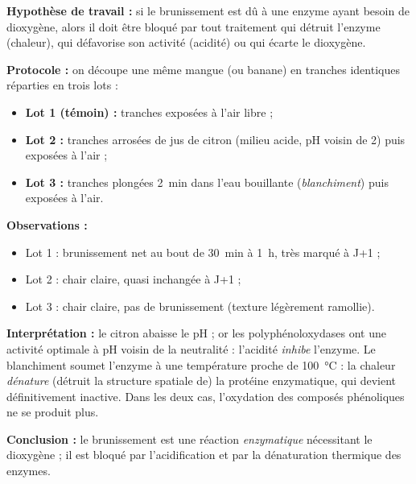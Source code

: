 \documentclass[11pt]{article}
\newcommand{\cle}[1]{{\popxbold\color{popdark}#1}}
\begin{document}
\textbf{Hypothèse de travail :} si le brunissement est dû à une enzyme ayant besoin de dioxygène, alors il doit être bloqué par tout traitement qui détruit l'enzyme (chaleur), qui défavorise son activité (acidité) ou qui écarte le dioxygène.

\begin{experience}
\textbf{Protocole :} on découpe une même mangue (ou banane) en tranches identiques réparties en trois lots :
\begin{itemize}
\item \textbf{Lot 1 (témoin) :} tranches exposées à l'air libre ;
\item \textbf{Lot 2 :} tranches arrosées de jus de citron (milieu acide, pH voisin de 2) puis exposées à l'air ;
\item \textbf{Lot 3 :} tranches plongées \SI{2}{min} dans l'eau bouillante (\emph{blanchiment}) puis exposées à l'air.
\end{itemize}

\textbf{Observations :}
\begin{itemize}
\item Lot 1 : brunissement net au bout de \SI{30}{min} à \SI{1}{h}, très marqué à J+1 ;
\item Lot 2 : chair claire, quasi inchangée à J+1 ;
\item Lot 3 : chair claire, pas de brunissement (texture légèrement ramollie).
\end{itemize}

\textbf{Interprétation :} le citron abaisse le pH ; or les polyphénoloxydases ont une activité optimale à pH voisin de la neutralité : l'acidité \emph{inhibe} l'enzyme. Le blanchiment soumet l'enzyme à une température proche de \SI{100}{\celsius} : la chaleur \emph{dénature} (détruit la structure spatiale de) la protéine enzymatique, qui devient définitivement inactive. Dans les deux cas, l'oxydation des composés phénoliques ne se produit plus.

\textbf{Conclusion :} le brunissement est une réaction \emph{enzymatique} nécessitant le dioxygène ; il est bloqué par l'\cle{acidification} et par la \cle{dénaturation thermique} des enzymes.
\end{experience}
\end{document}
